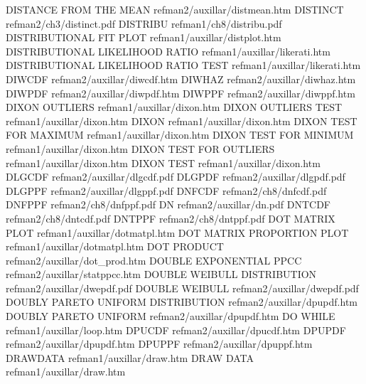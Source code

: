 DISTANCE FROM THE MEAN                  refman2/auxillar/distmean.htm
DISTINCT                                refman2/ch3/distinct.pdf
DISTRIBU                                refman1/ch8/distribu.pdf
DISTRIBUTIONAL FIT PLOT                 refman1/auxillar/distplot.htm
DISTRIBUTIONAL LIKELIHOOD RATIO         refman1/auxillar/likerati.htm
DISTRIBUTIONAL LIKELIHOOD RATIO TEST    refman1/auxillar/likerati.htm
DIWCDF                                  refman2/auxillar/diwcdf.htm
DIWHAZ                                  refman2/auxillar/diwhaz.htm
DIWPDF                                  refman2/auxillar/diwpdf.htm
DIWPPF                                  refman2/auxillar/diwppf.htm
DIXON OUTLIERS                          refman1/auxillar/dixon.htm
DIXON OUTLIERS TEST                     refman1/auxillar/dixon.htm
DIXON                                   refman1/auxillar/dixon.htm
DIXON TEST FOR MAXIMUM                  refman1/auxillar/dixon.htm
DIXON TEST FOR MINIMUM                  refman1/auxillar/dixon.htm
DIXON TEST FOR OUTLIERS                 refman1/auxillar/dixon.htm
DIXON TEST                              refman1/auxillar/dixon.htm
DLGCDF                                  refman2/auxillar/dlgcdf.pdf
DLGPDF                                  refman2/auxillar/dlgpdf.pdf
DLGPPF                                  refman2/auxillar/dlgppf.pdf
DNFCDF                                  refman2/ch8/dnfcdf.pdf
DNFPPF                                  refman2/ch8/dnfppf.pdf
DN                                      refman2/auxillar/dn.pdf
DNTCDF                                  refman2/ch8/dntcdf.pdf
DNTPPF                                  refman2/ch8/dntppf.pdf
DOT MATRIX PLOT                         refman1/auxillar/dotmatpl.htm
DOT MATRIX PROPORTION PLOT              refman1/auxillar/dotmatpl.htm
DOT PRODUCT                             refman2/auxillar/dot_prod.htm
DOUBLE EXPONENTIAL PPCC                 refman2/auxillar/statppcc.htm
DOUBLE WEIBULL DISTRIBUTION             refman2/auxillar/dwepdf.pdf
DOUBLE WEIBULL                          refman2/auxillar/dwepdf.pdf
DOUBLY PARETO UNIFORM DISTRIBUTION      refman2/auxillar/dpupdf.htm
DOUBLY PARETO UNIFORM                   refman2/auxillar/dpupdf.htm
DO WHILE                                refman1/auxillar/loop.htm
DPUCDF                                  refman2/auxillar/dpucdf.htm
DPUPDF                                  refman2/auxillar/dpupdf.htm
DPUPPF                                  refman2/auxillar/dpuppf.htm
DRAWDATA                                refman1/auxillar/draw.htm
DRAW DATA                               refman1/auxillar/draw.htm
